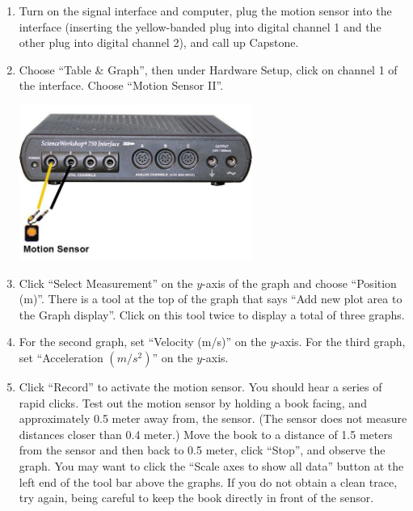 \begin{enumerate}[label=\arabic*.]

\item Turn on the signal interface and computer, plug the motion sensor into the interface (inserting the yellow-banded plug into digital channel 1 and the other plug into digital channel 2), and call up Capstone.

\item Choose ``Table \& Graph'', then under Hardware Setup, click on channel 1 of the interface.  Choose ``Motion Sensor II''.
\begin{center} \includegraphics*[width=0.6\textwidth]{imgs/6labs/6Alab/6Aexp2/6A-exp2_fig2_new.jpg} \end{center}

\item Click ``Select Measurement'' on the \(y\)-axis of the graph and choose ``Position (m)''.  There is a tool at the top of the graph that says ``Add new plot area to the Graph display''.  Click on this tool twice to display a total of three graphs.

\item For the second graph, set ``Velocity (m/s)'' on the \(y\)-axis.  For the third graph, set ``Acceleration $(m/s^2)$'' on the \(y\)-axis.

\item Click ``Record'' to activate the motion sensor.  You should hear a series of rapid clicks.  Test out the motion sensor by holding a book facing, and approximately 0.5 meter away from, the sensor.  (The sensor does not measure distances closer than 0.4 meter.)  Move the book to a distance of 1.5 meters from the sensor and then back to 0.5 meter, click ``Stop'', and observe the graph.  You may want to click the ``Scale axes to show all data'' button at the left end of the tool bar above the graphs.  If you do not obtain a clean trace, try again, being careful to keep the book directly in front of the sensor.

\end{enumerate}

